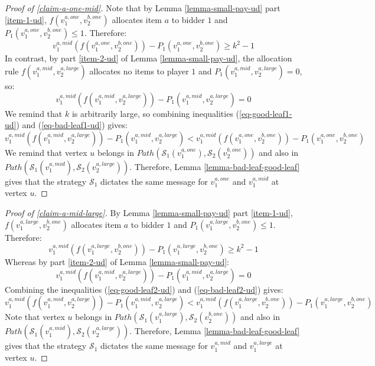 \begin{proof}[Proof of \cref{claim-a-one-mid}]
      Note that by Lemma \ref{lemma-small-pay-ud} part \ref{item-1-ud}, $f(v_1^{a,one},v_2^{b,one})$ allocates item $a$ to bidder $1$ and $P_1(v_1^{a,one},v_2^{b,one})\le 1$. Therefore:
\begin{equation}\label{eq-good-leaf1-ud}
 v_1^{a,mid}(f(v_1^{a,one},v_2^{b,one}))-P_1(v_1^{a,one},v_2^{b,one})\ge k^2-1   
\end{equation}
 In contrast, by part \ref{item-2-ud} of Lemma \ref{lemma-small-pay-ud}, the allocation rule  $f(v_1^{a,mid},v_2^{a,large})$ allocates no items to player $1$ and $P_1(v_1^{a,mid},v_2^{a,large})=0$, so:
 \begin{equation}\label{eq-bad-leaf1-ud}
 v_1^{a,mid}(f(v_1^{a,mid},v_2^{a,large}))-P_1(v_1^{a,mid},v_2^{a,large})= 0   
\end{equation}
We remind that $k$ is arbitrarily large,
so combining inequalities (\ref{eq-good-leaf1-ud}) and (\ref{eq-bad-leaf1-ud}) gives:
\begin{equation*}
 v_1^{a,mid}(f(v_1^{a,mid},v_2^{a,large}))-P_1(v_1^{a,mid},v_2^{a,large})< 
v_1^{a,mid}(f(v_1^{a,one},v_2^{b,one}))-P_1(v_1^{a,one},v_2^{b,one})  
\end{equation*}
We remind that vertex $u$ belongs in $Path(\mathcal S_1(v_1^{a,one}),\mathcal S_2(v_2^{b,one}))$ and also in
$Path(\mathcal{S}_1(v_1^{a,mid}),\allowbreak\mathcal{S}_2(v_2^{a,large}))$. Therefore, Lemma \ref{lemma-bad-leaf-good-leaf} gives that the strategy $\mathcal S_1$ dictates the same message for  $v_1^{a,one}$ and $v_1^{a,mid}$ at vertex $u$.
\end{proof}

\begin{proof}[Proof of \cref{claim-a-mid-large}]
     By Lemma \ref{lemma-small-pay-ud} part \ref{item-1-ud}, $f(v_1^{a,large},v_2^{b,one})$ allocates item $a$ to bidder $1$ and $P_1(v_1^{a,large},\allowbreak v_2^{b,one})\le 1$. Therefore:
\begin{equation}\label{eq-good-leaf2-ud}
 v_1^{a,mid}(f(v_1^{a,large},v_2^{b,one}))-P_1(v_1^{a,large},v_2^{b,one})\ge k^2-1   
\end{equation}
Whereas by part \ref{item-2-ud} of Lemma \ref{lemma-small-pay-ud}: 
 \begin{equation}\label{eq-bad-leaf2-ud}
 v_1^{a,mid}(f(v_1^{a,mid},v_2^{a,large}))-P_1(v_1^{a,mid},v_2^{a,large})=0   
\end{equation}
Combining the inequalities (\ref{eq-good-leaf2-ud}) and (\ref{eq-bad-leaf2-ud}) gives:
\begin{equation*}
 v_1^{a,mid}(f(v_1^{a,mid},v_2^{a,large}))-P_1(v_1^{a,mid},v_2^{a,large})< 
v_1^{a,mid}(f(v_1^{a,large},v_2^{b,one}))-P_1(v_1^{a,large},v_2^{b,one})
\end{equation*}
Note that vertex $u$ belongs in $Path(\mathcal S_1(v_1^{a,large}),\mathcal S_2(v_2^{b,one}))$ and also in
$Path(\mathcal{S}_1(v_1^{a,mid}),\allowbreak\mathcal{S}_2(v_2^{a,large}))$. Therefore, Lemma \ref{lemma-bad-leaf-good-leaf} gives that the strategy $\mathcal S_1$ dictates the same message for  $v_1^{a,mid}$ and $v_1^{a,large}$ at vertex $u$.
\end{proof}
      

